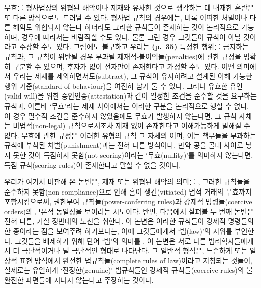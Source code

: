 무효를 형사법상의 위협된 해악이나 제재와 유사한 것으로 생각하는 데
내재한 혼란은 또 다른 방식으로도 드러날 수 있다. 형사법 규칙의 경우에는,
비록 어떠한 처벌이나 다른 해악도 위협되지 않는다 하더라도 그러한
규칙들이 존재하는 것이 논리적으로 가능하며, 경우에 따라서는 바람직할
수도 있다. 물론 그런 경우 그것들이  규칙이 아닐
것이라고 주장할 수도 있다. 그럼에도 불구하고 우리는 \textbf{(p.~35)}
특정한 행위를 금지하는 규칙과, 그 규칙이 위반될 경우 부과될
제재적-불이익들(penalties)에 관한 규정을 명확히 구분할 수 있으며, 후자가
없이 전자만이 존재한다고 가정할 수도 있다. 어떤 의미에서 우리는 제재를
제외하면서도(subtract), 그 규칙이 유지하려고 설계된 이해 가능한 행위
기준(standard of behaviour)을 여전히 남겨 둘 수 있다. 그러나 유효한
유언(valid will)을 위한 증인인증(attestation)과 같이 일정한 조건을
준수할 것을 요구하는 규칙과, 이른바 ‘무효’라는 제재 사이에서는 이러한
구분을 논리적으로 행할 수 없다. 이 경우 필수적 조건을 준수하지
않았음에도 무효가 발생하지 않는다면, 그 규칙 자체는 비법적(non-legal)
규칙으로서조차 제재 없이 존재한다고 이해가능하게 말해질 수 없다. 무효에
관한 규정은 이러한 유형의 규칙 그 자체의 이며, 이는
책무들을 부과하는 규칙에 부착된 처벌(punishment)과는 전혀 다른 방식이다.
만약 공을 골대 사이로 넣지 못한 것이 득점하지 못함(not scoring)이라는
‘무효(nullity)’를 의미하지 않는다면, 득점 규칙(scoring rules)이
존재한다고 말할 수 없을 것이다.

우리가 여기서 비판해 온 논변은, 제재 또는 위협된 해악의 의미를
, 그러한 규칙들을 준수하지
못함(non-compliance)으로 인해 흠이 생긴(vitiated) 법적 거래의 무효까지
포함시킴으로써, 권한부여 규칙들(power-conferring rules)과 강제적
명령들(coercive orders)의 근본적 동일성을 보이려는 시도이다. 반면,
다음에서 살펴볼 두 번째 논변은 전혀 다른, 기실 정반대의 노선을 취한다.
이 논변은 이러한 규칙들이 강제적 명령들의 한 종이라는 점을 보여주려
하기보다는, 아예 그것들에게서 ‘법(law)’의 지위를 부인한다. 그것들을
배제하기 위해 단어 ‘법’의 의미를 . 이
논변은 서로 다른 법리학자들에게서 더 극단적이거나 덜 극단적인 형태로
나타난다. 그 일반적 형식은, 느슨하게 또는 일상적 표현 방식에서 완전한
법규칙들(complete rules of law)이라고 지칭되는 것들이, 실제로는 유일하게
‘진정한(genuine)’ 법규칙들인 강제적 규칙들(coercive rules)의 불완전한
파편들에 지나지 않는다고 주장하는 것이다.

\subsubsection{\texorpdfstring{}{법들의 파편들로서의 권한부여 규칙들(Power-conferring rules as fragments of laws)}}\label{uxbc95uxb4e4uxc758-uxd30cuxd3b8uxb4e4uxb85cuxc11cuxc758-uxad8cuxd55cuxbd80uxc5ec-uxaddcuxce59uxb4e4power-conferring-rules-as-fragments-of-laws}

